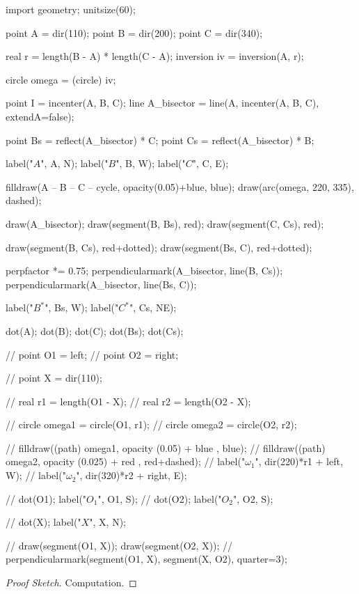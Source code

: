 \documentclass[]{scrartcl}
\begin{document}
\begin{center}
	\begin{asy}
import geometry;
unitsize(60);

point A = dir(110);
point B = dir(200);
point C = dir(340);

real r = length(B - A) * length(C - A);
inversion iv = inversion(A, r);

circle omega = (circle) iv;

point I = incenter(A, B, C);
line A_bisector = line(A, incenter(A, B, C), extendA=false);

point Bs = reflect(A_bisector) * C;
point Cs = reflect(A_bisector) * B;

label("$A$", A, N);
label("$B$", B, W);
label("$C$", C, E);

filldraw(A -- B -- C -- cycle, opacity(0.05)+blue, blue);
draw(arc(omega, 220, 335), dashed);

draw(A_bisector);
draw(segment(B, Bs), red);
draw(segment(C, Cs), red);

draw(segment(B, Cs), red+dotted);
draw(segment(Bs, C), red+dotted);

perpfactor *= 0.75;
perpendicularmark(A_bisector, line(B, Cs));
perpendicularmark(A_bisector, line(Bs, C));

label("$B^*$", Bs, W);
label("$C^*$", Cs, NE);

dot(A); dot(B); dot(C);
dot(Bs); dot(Cs);


// point O1 = left;
// point O2 = right;

// point X = dir(110);

// real r1 = length(O1 - X);
// real r2 = length(O2 - X);

// circle omega1 = circle(O1, r1);
// circle omega2 = circle(O2, r2);

// filldraw((path) omega1, opacity (0.05) + blue , blue);
// filldraw((path) omega2, opacity (0.025) + red , red+dashed);
// label("$\omega_1$", dir(220)*r1 + left, W);
// label("$\omega_2$", dir(320)*r2 + right, E);

// dot(O1); label("$O_1$", O1, S);
// dot(O2); label("$O_2$", O2, S);

// dot(X); label("$X$", X, N);

// draw(segment(O1, X)); draw(segment(O2, X));
// perpendicularmark(segment(O1, X), segment(X, O2), quarter=3);
\end{asy}
\end{center}

\begin{proof}[Proof Sketch]
Computation.	
\end{proof}


\end{document}
